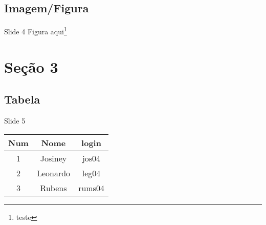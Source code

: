 \documentclass{beamer}
\begin{document}
\subsection{Imagem/Figura}
\begin{frame}{Slide 4}
	Figura aqui\footnote{teste}
\end{frame}

\section{Seção 3}
\subsection{Tabela}
\begin{frame}{Slide 5}
	\begin{tabular}{|c|c|c|}
		\hline
		Num & Nome & login \\
		\hline
		\hline
		1 & Josiney & jos04 \\
		\hline
		2 & Leonardo & leg04 \\
		\hline
		3 & Rubens & rums04 \\
		\hline
	\end{tabular}
\end{frame}
	
\end{document}
